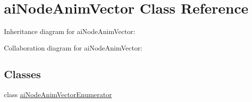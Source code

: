 \hypertarget{classai_node_anim_vector}{\section{ai\+Node\+Anim\+Vector Class Reference}
\label{classai_node_anim_vector}
}


Inheritance diagram for ai\+Node\+Anim\+Vector\+:


Collaboration diagram for ai\+Node\+Anim\+Vector\+:
\subsection*{Classes}
\begin{DoxyCompactItemize}
\item 
class \hyperlink{classai_node_anim_vector_1_1ai_node_anim_vector_enumerator}{ai\+Node\+Anim\+Vector\+Enumerator}
\end{DoxyCompactItemize}
